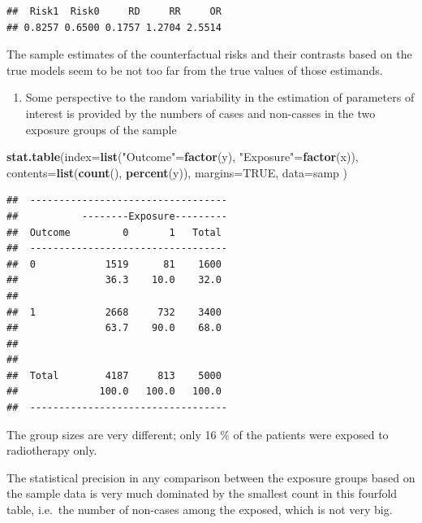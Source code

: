 \documentclass[
]{book}
\newenvironment{Shaded}{\begin{snugshade}}{\end{snugshade}}
\newcommand{\AttributeTok}[1]{\textcolor[rgb]{0.13,0.29,0.53}{#1}}
\newcommand{\ConstantTok}[1]{\textcolor[rgb]{0.56,0.35,0.01}{#1}}
\newcommand{\FunctionTok}[1]{\textcolor[rgb]{0.13,0.29,0.53}{\textbf{#1}}}
\newcommand{\NormalTok}[1]{#1}
\newcommand{\OtherTok}[1]{\textcolor[rgb]{0.56,0.35,0.01}{#1}}
\newcommand{\StringTok}[1]{\textcolor[rgb]{0.31,0.60,0.02}{#1}}
\providecommand{\tightlist}{%
  \setlength{\itemsep}{0pt}\setlength{\parskip}{0pt}}
\theoremstyle{definition}
\theoremstyle{definition}
\theoremstyle{definition}
\theoremstyle{definition}
\theoremstyle{remark}
\begin{document}
\begin{verbatim}
##  Risk1  Risk0     RD     RR     OR 
## 0.8257 0.6500 0.1757 1.2704 2.5514
\end{verbatim}

The sample estimates of the counterfactual risks and their contrasts
based on the true models seem to be not too far from the true values of
those estimands.

\begin{enumerate}
\def\labelenumi{\arabic{enumi}.}
\setcounter{enumi}{4}
\tightlist
\item
  Some perspective to the random variability in the estimation of
  parameters of interest is provided by the numbers of cases and
  non-casses in the two exposure groups of the sample
\end{enumerate}

\begin{Shaded}
\begin{Highlighting}[]
\FunctionTok{stat.table}\NormalTok{(}\AttributeTok{index=}\FunctionTok{list}\NormalTok{(}\StringTok{"Outcome"}\OtherTok{=}\FunctionTok{factor}\NormalTok{(y), }\StringTok{"Exposure"}\OtherTok{=}\FunctionTok{factor}\NormalTok{(x)),}
           \AttributeTok{contents=}\FunctionTok{list}\NormalTok{(}\FunctionTok{count}\NormalTok{(), }\FunctionTok{percent}\NormalTok{(y)),}
           \AttributeTok{margins=}\ConstantTok{TRUE}\NormalTok{, }\AttributeTok{data=}\NormalTok{samp  )}
\end{Highlighting}
\end{Shaded}

\begin{verbatim}
##  ---------------------------------- 
##           --------Exposure--------- 
##  Outcome         0       1   Total  
##  ---------------------------------- 
##  0            1519      81    1600  
##               36.3    10.0    32.0  
##                                     
##  1            2668     732    3400  
##               63.7    90.0    68.0  
##                                     
##                                     
##  Total        4187     813    5000  
##              100.0   100.0   100.0  
##  ----------------------------------
\end{verbatim}

The group sizes are very different; only 16 \% of the patients were
exposed to radiotherapy only.

The statistical precision in any comparison between the exposure groups
based on the sample data is very much dominated by the smallest count in
this fourfold table, i.e.~the number of non-cases among the exposed,
which is not very big.
\end{document}
